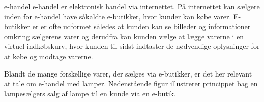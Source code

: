 e-handel
e-handel er elektronisk handel via internettet. På internettet kan sælgere inden for e-handel have såkaldte e-butikker, hvor kunder kan købe varer. E-butikker er er ofte udformet således at kunden kan se billeder og informationer omkring sælgerens varer og derudfra kan kunden vælge at lægge varerne i en virtuel indkøbskurv, hvor kunden til sidst indtaster de nødvendige oplysninger for at købe og modtage varerne.

Blandt de mange forskellige varer, der sælges via e-butikker, er det her relevant at tale om e-handel med lamper. Nedenstående figur illustrerer princippet bag en lampesælgers salg af lampe til en kunde via en e-butik.


